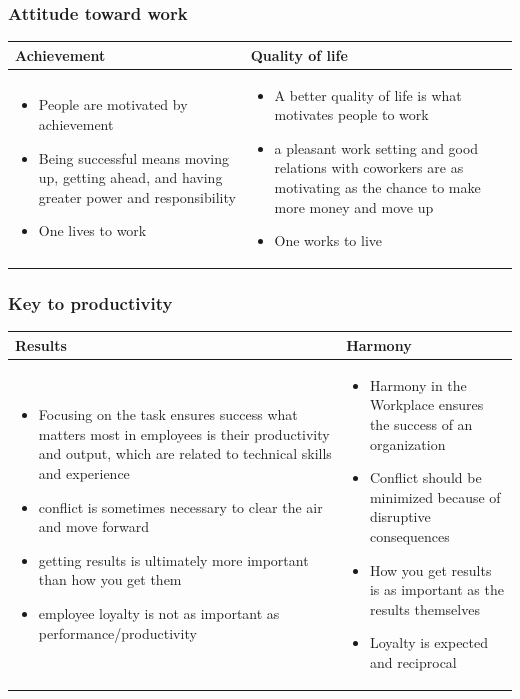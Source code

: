 \subsubsection{Attitude toward work}
\begin{tabularx}{\textwidth}{X|X}
	\textbf{Achievement} & \textbf{Quality of life} \\ 
	\hline 
	\begin{itemize}
		\tightlist
		\item People are motivated by achievement
		\item Being successful means moving up,	getting ahead, and having greater power and responsibility
		\item One lives to work
	\end{itemize}
	&
	\begin{itemize}
		\tightlist
		\item A better quality of life is what motivates people to work
		\item a pleasant work setting and good relations with coworkers are as motivating as the chance to make more money and move up
		\item One works to live
	\end{itemize} \\
\end{tabularx}

\subsubsection{Key to productivity}
\begin{tabularx}{\textwidth}{X|X}
	\textbf{Results} & \textbf{Harmony} \\ 
	\hline 
	\begin{itemize}
		\tightlist
		\item Focusing on the task ensures success what matters	most in employees is their productivity and output, which are related to technical skills and experience
		\item conflict is sometimes necessary to clear the air and move forward
		\item getting results is ultimately more important than how you get them
		\item employee loyalty is not as important as performance/productivity
	\end{itemize}
	&
	\begin{itemize}
		\tightlist
		\item Harmony in the Workplace ensures the success of an organization
		\item Conflict should be minimized because of disruptive consequences
		\item How you get results is as important as the results themselves
		\item Loyalty is expected and reciprocal
	\end{itemize} \\
\end{tabularx}

